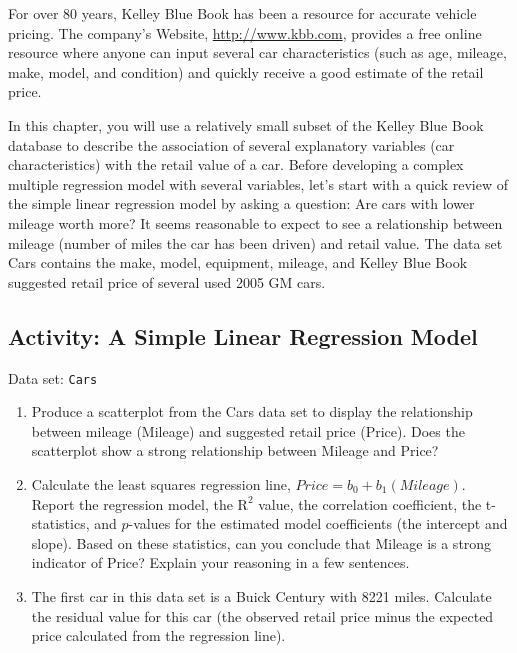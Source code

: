 \documentclass[
]{book}
\begin{document}
For over 80 years, Kelley Blue Book has been a resource for accurate vehicle pricing. The company's Website, \url{http://www.kbb.com}, provides a free online resource where anyone can input several car characteristics (such as age, mileage, make, model, and condition) and quickly receive a good estimate of the retail price.

In this chapter, you will use a relatively small subset of the Kelley Blue Book database to describe the association of several explanatory variables (car characteristics) with the retail value of a car. Before developing a complex multiple regression model with several variables, let's start with a quick review of the simple linear regression model by asking a question: Are cars with lower mileage worth more? It seems reasonable
to expect to see a relationship between mileage (number of miles the car has been driven) and retail value. The data set Cars contains the make, model, equipment, mileage, and Kelley Blue Book suggested retail price of several used 2005 GM cars.

\hypertarget{activity-a-simple-linear-regression-model}{%
\subsection*{Activity: A Simple Linear Regression Model}\label{activity-a-simple-linear-regression-model}}

Data set: \texttt{Cars}

\begin{enumerate}
\def\labelenumi{\arabic{enumi}.}
\item
  Produce a scatterplot from the Cars data set to display the relationship between mileage (Mileage) and suggested retail price (Price). Does the scatterplot show a strong relationship between Mileage and Price?
\item
  Calculate the least squares regression line, \(Price = b_0 + b_1(Mileage)\). Report the regression model, the \(\mathrm{R}^2\) value, the correlation coefficient, the t-statistics, and \(p\)-values for the estimated model coefficients (the intercept and slope). Based on these statistics, can you conclude that Mileage is a strong indicator of Price? Explain your reasoning in a few sentences.
\item
  The first car in this data set is a Buick Century with 8221 miles. Calculate the residual value for this car (the observed retail price minus the expected price calculated from the regression line).
\end{enumerate}
\end{document}
